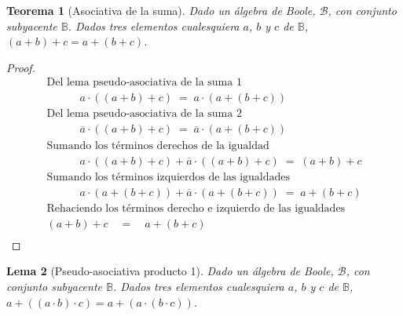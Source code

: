 \documentclass[final,12pt,a4paper,twoside,fleqn]{extbook}
\newcommand{\setB}{\ensuremath{\mathbb{B}}}
\newtheorem{thm}{Teorema}[chapter]
\newtheorem{lem}[thm]{Lema}
\theoremstyle{definition}
\theoremstyle{remark}
\begin{document}
\begin{thm}[Asociativa de la suma]
Dado un álgebra de Boole, \(\mathscr{B}\), con conjunto subyacente \(\setB\). Dados tres elementos cualesquiera \(a\), \(b\) y \(c\) de \(\setB\), \( ( a + b ) + c = a + ( b + c ) \).
\end{thm}



\begin{proof}
\begin{align}
\text{Del lema pseudo-asociativa de la suma 1}\\
\qquad\quad a \cdot \left( \left( a + b \right) + c \right) \;=\; a \cdot \left( a + \left( b + c \right) \right) \\ 
\text{Del lema pseudo-asociativa de la suma 2}\\
\qquad\quad \overline{a} \cdot \left( \left( a + b \right) + c \right) \;=\; \overline{a} \cdot \left( a + \left( b + c \right) \right) \\
\text{Sumando los términos derechos de la igualdad}\\
\qquad\quad a \cdot \left( \left( a + b \right) + c \right) + \overline{a} \cdot \left( \left( a + b \right) + c \right) \;=\; \left( a + b \right) + c\\
\text{Sumando los términos izquierdos de las igualdades}\\ 
\qquad\quad a \cdot \left( a + \left( b + c \right) \right) + \overline{a} \cdot \left( a + \left( b + c \right) \right) \;=\; a + \left( b + c \right)\\
\text{Rehaciendo los términos derecho e izquierdo de las igualdades}\\ 
\left( a + b \right) + c \quad = \quad  a + \left( b + c \right)\\
\end{align}
\end{proof}



\begin{lem}[Pseudo-asociativa producto 1]
Dado un álgebra de Boole, \(\mathscr{B}\), con conjunto subyacente \(\setB\). Dados tres elementos cualesquiera \(a\), \(b\) y \(c\) de \(\setB\), \( a + ( ( a \cdot b ) \cdot c ) = a + ( a \cdot ( b \cdot c ) )\).
\end{lem}
\end{document}

